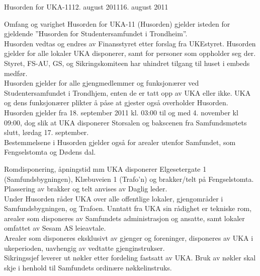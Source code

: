 \documentclass[../fsbok.tex]{subfiles}
\begin{document}
\begin{instruks}{Husorden for UKA-11}{12. august 2011}{16. august 2011}



\begin{instruksledd}{Omfang og varighet}
Husorden for UKA-11 (Husorden) gjelder isteden for gjeldende ”Husorden for
Studentersamfundet i Trondheim”.\\

Husorden vedtas og endres av Finansstyret etter forslag fra UKEstyret. Husorden
gjelder for alle lokaler UKA disponerer, samt for personer som oppholder seg der.
Styret, FS-AU, GS, og Sikringskomiteen har uhindret tilgang til huset i embeds medfør.\\

Husorden gjelder for alle gjengmedlemmer og funksjonærer ved
Studentersamfundet i Trondhjem, enten de er tatt opp av UKA eller ikke. UKA og
dens funksjonærer plikter å påse at gjester også overholder Husorden.\\

Husorden gjelder fra 18. september 2011 kl. 03:00 til og med 4. november kl
09:00, dog slik at UKA disponerer Storsalen og bakscenen fra Samfundsmøtets
slutt, lørdag 17. september.\\

Bestemmelsene i Husorden gjelder også for arealer utenfor Samfundet, som
Fengselstomta og Dødens dal.
\end{instruksledd}

\begin{instruksledd}{Romdisponering, åpningstid mm}
UKA disponerer Elgesetergate 1 (Samfundsbygningen), Klæbuveien 1 (Trafo’n)
og brakker/telt på Fengselstomta. Plassering av brakker og telt anvises av
Daglig leder.\\

Under Husorden råder UKA over alle offentlige lokaler, gjengområder i
Samfundsbygningen, og Trafoen. Unntatt fra UKA sin rådighet er tekniske rom,
arealer som disponeres av Samfundets administrasjon og ansatte, samt lokaler
omfattet av Sesam AS leieavtale.\\

Arealer som disponeres eksklusivt av gjenger og foreninger, disponeres av UKA i
ukeperioden, uavhengig av vedtatte gjenginstrukser.\\

Sikringssjef leverer ut nøkler etter fordeling fastsatt av UKA. Bruk av nøkler skal
skje i henhold til Samfundets ordinære nøkkelinstruks.\\


\end{instruksledd}
\end{instruks}
\end{document}
